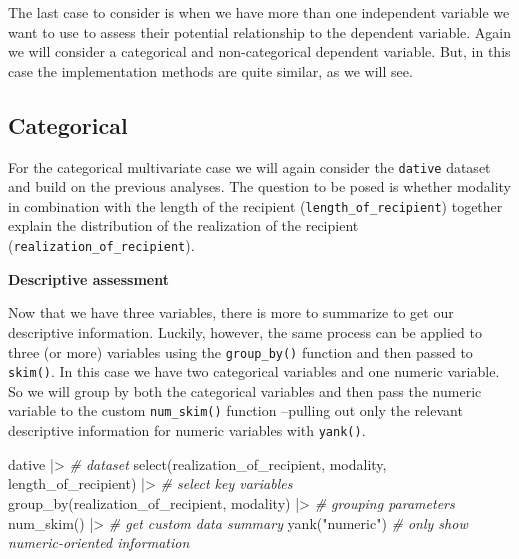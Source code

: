 \documentclass[
  letterpaper,
]{scrbook}
\newenvironment{Shaded}{\begin{snugshade}}{\end{snugshade}}
\newcommand{\CommentTok}[1]{\textcolor[rgb]{0.00,0.00,0.00}{\textit{#1}}}
\newcommand{\FunctionTok}[1]{\textcolor[rgb]{0.00,0.00,0.00}{#1}}
\newcommand{\NormalTok}[1]{\textcolor[rgb]{0.00,0.00,0.00}{#1}}
\newcommand{\SpecialCharTok}[1]{\textcolor[rgb]{0.00,0.00,0.00}{#1}}
\newcommand{\StringTok}[1]{\textcolor[rgb]{0.00,0.00,0.00}{#1}}
\begin{document}
The last case to consider is when we have more than one independent
variable we want to use to assess their potential relationship to the
dependent variable. Again we will consider a categorical and
non-categorical dependent variable. But, in this case the implementation
methods are quite similar, as we will see.

\hypertarget{categorical-2}{%
\subsection{Categorical}\label{categorical-2}}

For the categorical multivariate case we will again consider the
\texttt{dative} dataset and build on the previous analyses. The question
to be posed is whether modality in combination with the length of the
recipient (\texttt{length\_of\_recipient}) together explain the
distribution of the realization of the recipient
(\texttt{realization\_of\_recipient}).

\textbf{Descriptive assessment}

Now that we have three variables, there is more to summarize to get our
descriptive information. Luckily, however, the same process can be
applied to three (or more) variables using the \texttt{group\_by()}
function and then passed to \texttt{skim()}. In this case we have two
categorical variables and one numeric variable. So we will group by both
the categorical variables and then pass the numeric variable to the
custom \texttt{num\_skim()} function --pulling out only the relevant
descriptive information for numeric variables with \texttt{yank()}.

\begin{Shaded}
\begin{Highlighting}[]
\NormalTok{dative }\SpecialCharTok{|\textgreater{}} \CommentTok{\# dataset}
  \FunctionTok{select}\NormalTok{(realization\_of\_recipient, modality, length\_of\_recipient) }\SpecialCharTok{|\textgreater{}} \CommentTok{\# select key variables}
  \FunctionTok{group\_by}\NormalTok{(realization\_of\_recipient, modality) }\SpecialCharTok{|\textgreater{}} \CommentTok{\# grouping parameters}
  \FunctionTok{num\_skim}\NormalTok{() }\SpecialCharTok{|\textgreater{}} \CommentTok{\# get custom data summary}
  \FunctionTok{yank}\NormalTok{(}\StringTok{"numeric"}\NormalTok{) }\CommentTok{\# only show numeric{-}oriented information}
\end{Highlighting}
\end{Shaded}
\end{document}
